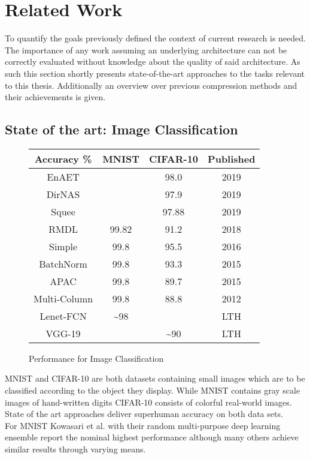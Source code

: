 \chapter{Related Work}
\label{ch:relatedwork}
To quantify the goals previously defined the context of current research is needed. The importance of any work assuming an underlying architecture can not be correctly evaluated without knowledge about the quality of said architecture. As such this section shortly presents state-of-the-art approaches to the tasks relevant to this thesis. Additionally an overview over previous compression methods and their achievements is given.


\section{State of the art: Image Classification}
\begin{figure}
	\begin{tabular}{c|c|c|c}
		Accuracy \% & MNIST & CIFAR-10 & Published\\
		\hline
		EnAET &  & 98.0 & 2019 \\
		DirNAS &  & 97.9 & 2019 \\
		Squee &  & 97.88 & 2019 \\
		RMDL & 99.82 & 91.2 & 2018 \\
		Simple & 99.8 & 95.5 & 2016 \\
		BatchNorm  & 99.8 & 93.3 & 2015 \\
		APAC & 99.8 & 89.7 & 2015\\
		Multi-Column & 99.8 & 88.8 & 2012 \\
		\hline
		Lenet-FCN & \textasciitilde98 &  & LTH \\
		VGG-19 &  & \textasciitilde90 & LTH \\
		
	\end{tabular}
	\caption{Performance for Image Classification}
\end{figure}
MNIST and CIFAR-10 are both datasets containing small images which are to be classified according to the object they display. While MNIST contains gray scale images of hand-written digits CIFAR-10 consists of colorful real-world images. State of the art approaches deliver superhuman accuracy on both data sets.\\
For MNIST Kowasari et al. with their random multi-purpose deep learning ensemble report the nominal highest performance \cite{RMDL} although many others achieve similar results through varying means.\\
